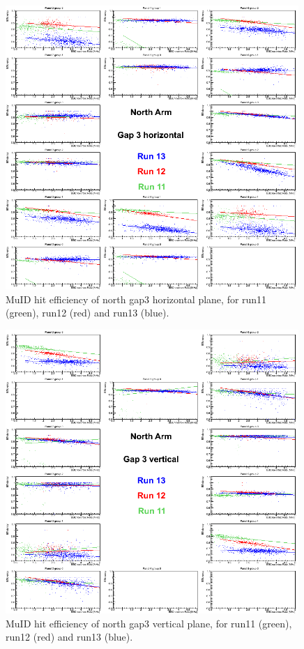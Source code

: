 \begin{figure}[h!]

  \centering
  \includegraphics[width=0.99\textwidth]{./figures/efficomp_North_gap3_horizontal.png}
  \caption{\label{Fig:efficiency:MuIdEff:a1g3p0}MuID hit efficiency of north gap3 horizontal plane, for run11 (green), run12 (red) and run13 (blue).}
\end{figure}
\clearpage


\begin{figure}[h!]

  \centering
  \includegraphics[width=0.99\textwidth]{./figures/efficomp_North_gap3_vertical.png}
  \caption{\label{Fig:efficiency:MuIdEff:a1g3p1}MuID hit efficiency of north gap3 vertical plane, for run11 (green), run12 (red) and run13 (blue).}
\end{figure}
\clearpage


